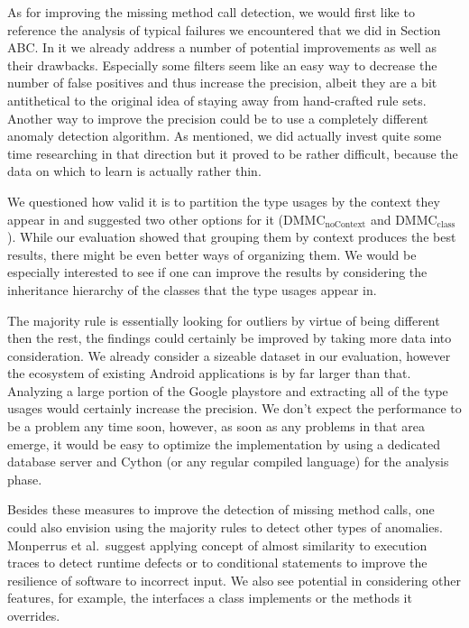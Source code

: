 As for improving the missing method call detection, we would first like to reference the analysis of typical failures we encountered that we did in Section ABC.
In it we already address a number of potential improvements as well as their drawbacks.
Especially some filters seem like an easy way to decrease the number of false positives and thus increase the precision, albeit they are a bit antithetical to the original idea of staying away from hand-crafted rule sets.
Another way to improve the precision could be to use a completely different anomaly detection algorithm.
As mentioned, we did actually invest quite some time researching in that direction but it proved to be rather difficult, because the data on which to learn is actually rather thin.

We questioned how valid it is to partition the type usages by the context they appear in and suggested two other options for it ($\text{DMMC}_\text{noContext}$ and $\text{DMMC}_\text{class}$).
While our evaluation showed that grouping them by context produces the best results, there might be even better ways of organizing them.
We would be especially interested to see if one can improve the results by considering the inheritance hierarchy of the classes that the type usages appear in.

The majority rule is essentially looking for outliers by virtue of being different then the rest, the findings could certainly be improved by taking more data into consideration.
We already consider a sizeable dataset in our evaluation, however the ecosystem of existing Android applications is by far larger than that.
Analyzing a large portion of the Google playstore and extracting all of the type usages would certainly increase the precision.
We don't expect the performance to be a problem any time soon, however, as soon as any problems in that area emerge, it would be easy to optimize the implementation by using a dedicated database server and Cython (or any regular compiled language) for the analysis phase.

Besides these measures to improve the detection of missing method calls, one could also envision using the majority rules to detect other types of anomalies.
Monperrus et al.\ suggest applying concept of almost similarity to execution traces to detect runtime defects or to conditional statements to improve the resilience of software to incorrect input.
We also see potential in considering other features, for example, the interfaces a class implements or the methods it overrides.

